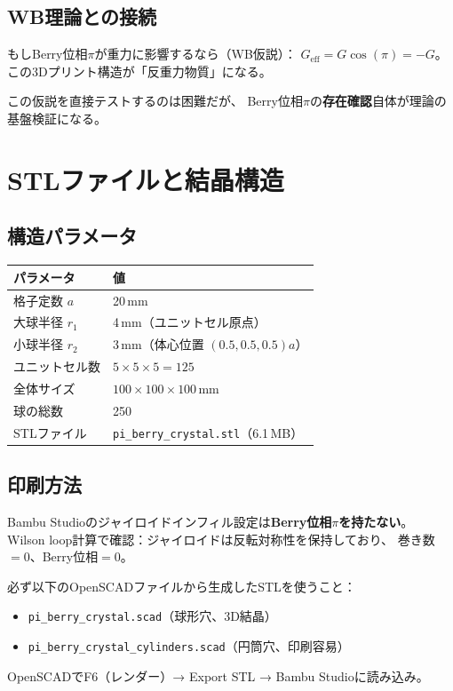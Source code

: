 \documentclass[11pt,a4paper]{article}
\begin{document}
\subsection{WB理論との接続}

もしBerry位相$\pi$が重力に影響するなら（WB仮説）：
$G_{\mathrm{eff}} = G\cos(\pi) = -G$。
この3Dプリント構造が「反重力物質」になる。

この仮説を直接テストするのは困難だが、
Berry位相$\pi$の\textbf{存在確認}自体が理論の基盤検証になる。

\section{STLファイルと結晶構造}

\subsection{構造パラメータ}

\begin{center}
\begin{tabular}{ll}
\toprule
パラメータ & 値 \\
\midrule
格子定数 $a$ & 20\,mm \\
大球半径 $r_1$ & 4\,mm（ユニットセル原点） \\
小球半径 $r_2$ & 3\,mm（体心位置 $(0.5, 0.5, 0.5)a$） \\
ユニットセル数 & $5 \times 5 \times 5 = 125$ \\
全体サイズ & $100 \times 100 \times 100$\,mm \\
球の総数 & 250 \\
STLファイル & \texttt{pi\_berry\_crystal.stl}（6.1\,MB） \\
\bottomrule
\end{tabular}
\end{center}

\subsection{印刷方法}

\begin{tcolorbox}[colback=red!5,colframe=red!60!black,title=重要：ジャイロイドインフィルは使えない]
Bambu Studioのジャイロイドインフィル設定は\textbf{Berry位相$\pi$を持たない}。
Wilson loop計算で確認：ジャイロイドは反転対称性を保持しており、
巻き数$= 0$、Berry位相$= 0$。

必ず以下のOpenSCADファイルから生成したSTLを使うこと：
\begin{itemize}
\item \texttt{pi\_berry\_crystal.scad}（球形穴、3D結晶）
\item \texttt{pi\_berry\_crystal\_cylinders.scad}（円筒穴、印刷容易）
\end{itemize}
OpenSCADでF6（レンダー）→ Export STL → Bambu Studioに読み込み。
\end{tcolorbox}
\end{document}
